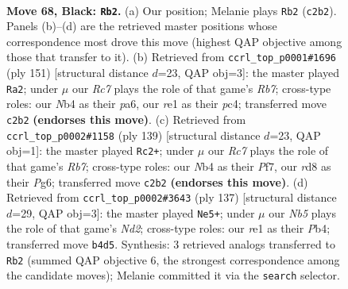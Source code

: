 \documentclass[11pt]{article}
\begin{document}
\clearpage

\begin{figure}[p]\centering
\begin{subfigure}{0.46\textwidth}\centering
\resizebox{\linewidth}{!}{%
\newchessgame
\chessboard[
  setfen={3R4/1p5p/1k4pP/5p2/pn3P2/6K1/2r5/4R3 b - - 1 68},
  showmover=false,
  pgfstyle=straightmove, color=movearrow, markmove={c2-b2}
]}
\caption{}
\end{subfigure}\hfill
\begin{subfigure}{0.46\textwidth}\centering
\resizebox{\linewidth}{!}{%
\newchessgame
\chessboard[
  setfen={8/5k2/P1K2p2/5ppp/2P5/6P1/1r6/4R3 b - - 14 76},
  showmover=false,
  pgfstyle=straightmove, color=movearrow, markmove={b2-a2}
]}
\caption{}
\end{subfigure}
\\[4pt]
\begin{subfigure}{0.46\textwidth}\centering
\resizebox{\linewidth}{!}{%
\newchessgame
\chessboard[
  setfen={8/2P2p2/2K1k1p1/6p1/8/5P1P/pr6/3R4 b - - 16 70},
  showmover=false,
  pgfstyle=straightmove, color=movearrow, markmove={b2-c2}
]}
\caption{}
\end{subfigure}\hfill
\begin{subfigure}{0.46\textwidth}\centering
\resizebox{\linewidth}{!}{%
\newchessgame
\chessboard[
  setfen={8/3nk3/3p2p1/2pP2P1/1p2P3/3K4/8/5R2 b - - 4 69},
  showmover=false,
  pgfstyle=straightmove, color=movearrow, markmove={d7-e5}
]}
\caption{}
\end{subfigure}
\caption{\textbf{Move 68, Black: \texttt{Rb2}.} (a) Our position; Melanie plays \texttt{Rb2} (\texttt{c2b2}). Panels (b)--(d) are the retrieved master positions whose correspondence most drove this move (highest QAP objective among those that transfer to it). (b) Retrieved from \texttt{ccrl\_top\_p0001\#1696} (ply 151) [structural distance $d$=23, QAP obj=3]: the master played \texttt{Ra2}; under $\mu$ our \emph{Rc7} plays the role of that game's \emph{Rb7}; cross-type roles: our \emph{N}b4 as their \emph{p}a6, our \emph{r}e1 as their \emph{p}c4; transferred move \texttt{c2b2} \textbf{(endorses this move)}. (c) Retrieved from \texttt{ccrl\_top\_p0002\#1158} (ply 139) [structural distance $d$=23, QAP obj=1]: the master played \texttt{Rc2+}; under $\mu$ our \emph{Rc7} plays the role of that game's \emph{Rb7}; cross-type roles: our \emph{N}b4 as their \emph{P}f7, our \emph{r}d8 as their \emph{P}g6; transferred move \texttt{c2b2} \textbf{(endorses this move)}. (d) Retrieved from \texttt{ccrl\_top\_p0002\#3643} (ply 137) [structural distance $d$=29, QAP obj=3]: the master played \texttt{Ne5+}; under $\mu$ our \emph{Nb5} plays the role of that game's \emph{Nd2}; cross-type roles: our \emph{r}e1 as their \emph{P}b4; transferred move \texttt{b4d5}. Synthesis: 3 retrieved analogs transferred to \texttt{Rb2} (summed QAP objective 6, the strongest correspondence among the candidate moves); Melanie committed it via the \texttt{search} selector.}
\label{fig:thought-m135}
\end{figure}
\end{document}
